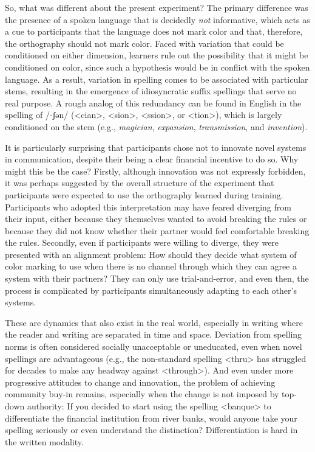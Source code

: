 \documentclass[doc,biblatex]{apa7}
\begin{document}
So, what was different about the present experiment? The primary difference was the presence of a spoken language that is decidedly \textit{not} informative, which acts as a cue to participants that the language does not mark color and that, therefore, the orthography should not mark color. Faced with variation that could be conditioned on either dimension, learners rule out the possibility that it might be conditioned on color, since such a hypothesis would be in conflict with the spoken language. As a result, variation in spelling comes to be associated with particular stems, resulting in the emergence of idiosyncratic suffix spellings that serve no real purpose. A rough analog of this redundancy can be found in English in the spelling of /-ʃən/ (<cian>, <sion>, <ssion>, or <tion>), which is largely conditioned on the stem (e.g., \textit{magician}, \textit{expansion}, \textit{transmission}, and \textit{invention}).

It is particularly surprising that participants chose not to innovate novel systems in communication, despite their being a clear financial incentive to do so. Why might this be the case? Firstly, although innovation was not expressly forbidden, it was perhaps suggested by the overall structure of the experiment that participants were expected to use the orthography learned during training. Participants who adopted this interpretation may have feared diverging from their input, either because they themselves wanted to avoid breaking the rules or because they did not know whether their partner would feel comfortable breaking the rules. Secondly, even if participants were willing to diverge, they were presented with an alignment problem: How should they decide what system of color marking to use when there is no channel through which they can agree a system with their partners? They can only use trial-and-error, and even then, the process is complicated by participants simultaneously adapting to each other's systems.

These are dynamics that also exist in the real world, especially in writing where the reader and writing are separated in time and space. Deviation from spelling norms is often considered socially unacceptable or uneducated, even when novel spellings are advantageous (e.g., the non-standard spelling <thru> has struggled for decades to make any headway against <through>). And even under more progressive attitudes to change and innovation, the problem of achieving community buy-in remains, especially when the change is not imposed by top-down authority: If you decided to start using the spelling <banque> to differentiate the financial institution from river banks, would anyone take your spelling seriously or even understand the distinction? Differentiation is hard in the written modality.
\end{document}
